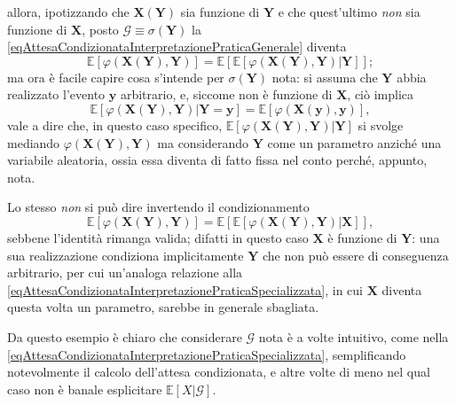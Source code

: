 \begin{oss}
      allora, ipotizzando che \(\mathbf X(\mathbf Y)\) sia funzione di \(\mathbf Y\) e che quest'ultimo \textit{non} sia funzione\footnotemark{} di \(\mathbf X\), posto \(\mathcal G\equiv\sigma(\mathbf Y)\) la \cref{eqAttesaCondizionataInterpretazionePraticaGenerale} diventa%
      \begin{equation*}
        \mathbb E[\varphi(\mathbf X(\mathbf Y),\mathbf Y)]
        =\mathbb E[\mathbb E[\varphi(\mathbf X(\mathbf Y),\mathbf Y)|\mathbf Y]];
      \end{equation*}
      ma ora è facile capire cosa s'intende per \(\sigma(\mathbf Y)\) nota: si assuma che \(\mathbf Y\) abbia realizzato l'evento \(\mathbf y\) arbitrario\footnotemark{}, e, siccome non è funzione di \(\mathbf X\), ciò implica%
      \begin{equation}
        \label{eqAttesaCondizionataInterpretazionePraticaSpecializzata}
        \mathbb E[\varphi(\mathbf X(\mathbf Y),\mathbf Y)|\mathbf Y=\mathbf y]
        =\mathbb E[\varphi(\mathbf X(\mathbf y),\mathbf y)],
      \end{equation}
      vale a dire che, in questo caso specifico, \(\mathbb E[\varphi(\mathbf X(\mathbf Y),\mathbf Y)|\mathbf Y]\) si svolge mediando \(\varphi(\mathbf X(\mathbf Y),\mathbf Y)\) ma considerando \(\mathbf Y\) come un parametro anziché una variabile aleatoria, ossia essa diventa di fatto fissa nel conto perché, appunto, nota.

      Lo stesso \textit{non} si può dire invertendo il condizionamento
      \begin{equation*}
        \mathbb E[\varphi(\mathbf X(\mathbf Y),\mathbf Y)]
        =\mathbb E[\mathbb E[\varphi(\mathbf X(\mathbf Y),\mathbf Y)|\mathbf X]],
      \end{equation*}
      sebbene l'identità rimanga valida; difatti in questo caso \(\mathbf X\) è funzione di \(\mathbf Y\): una sua realizzazione condiziona implicitamente \(\mathbf Y\) che non può essere di conseguenza arbitrario, per cui un'analoga relazione alla \cref{eqAttesaCondizionataInterpretazionePraticaSpecializzata}, in cui \(\mathbf X\) diventa questa volta un parametro, sarebbe in generale sbagliata.

      Da questo esempio è chiaro che considerare \(\mathcal G\) nota è a volte intuitivo, come nella \cref{eqAttesaCondizionataInterpretazionePraticaSpecializzata}, semplificando notevolmente il calcolo dell'attesa condizionata, e altre volte di meno nel qual caso non è banale esplicitare \(\mathbb E[X|\mathcal G]\).
    \end{oss}

